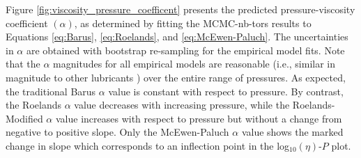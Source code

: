\documentclass[preprint,review,12pt]{elsarticle}
\begin{document}
	
%	


%        
%

    Figure \ref{fig:viscosity_pressure_coefficent} presents the predicted pressure-viscosity coefficient $(\alpha)$, as determined by fitting the MCMC-nb-tors results to Equations \ref{eq:Barus}, \ref{eq:Roelands}, and \ref{eq:McEwen-Paluch}. The uncertainties in $\alpha$ are obtained with bootstrap re-sampling for the empirical model fits. Note that the $\alpha$ magnitudes for all empirical models are reasonable (i.e., similar in magnitude to other lubricants \cite{Mundy1996,McCabe2001,Liu2015}) over the entire range of pressures. As expected, the traditional Barus $\alpha$ value is constant with respect to pressure. By contrast, the Roelands $\alpha$ value decreases with increasing pressure, while the Roelands-Modified $\alpha$ value increases with respect to pressure but without a change from negative to positive slope. Only the McEwen-Paluch $\alpha$ value shows the marked change in slope which corresponds to an inflection point in the log$_{10}(\eta)$-$P$ plot. 
\end{document}
